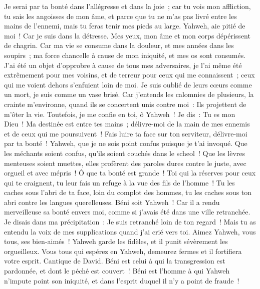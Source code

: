 \begin{multicols}{2}
Je serai par ta bonté dans l'allégresse et dans la joie~; car tu vois mon affliction, tu sais les angoisses de mon âme,
et parce que tu ne m'as pas livré entre les mains de l'ennemi, mais tu feras tenir mes pieds au large.
Yahweh, aie pitié de moi~! Car je suis dans la détresse. Mes yeux, mon âme et mon corps dépérissent de chagrin.
Car ma vie se consume dans la douleur, et mes années dans les soupirs~; ma force chancelle à cause de mon iniquité, et mes os sont consumés.
J'ai été un objet d'opprobre à cause de tous mes adversaires, je l'ai même été extrêmement pour mes voisins, et de terreur pour ceux qui me connaissent~; ceux qui me voient dehors s'enfuient loin de moi.
Je suis oublié de leurs cœurs comme un mort, je suis comme un vase brisé.
Car j'entends les calomnies de plusieurs, la crainte m'environne, quand ils se concertent unis contre moi~: Ils projettent de m'ôter la vie.
Toutefois, je me confie en toi, ô Yahweh~! Je dis~: Tu es mon Dieu~!
Ma destinée est entre tes mains~; délivre-moi de la main de mes ennemis et de ceux qui me poursuivent~!
Fais luire ta face sur ton serviteur, délivre-moi par ta bonté~!
Yahweh, que je ne sois point confus puisque je t'ai invoqué. Que les méchants soient confus, qu'ils soient couchés dans le scheol~!
Que les lèvres menteuses soient muettes, elles profèrent des paroles dures contre le juste, avec orgueil et avec mépris~!
Ô que ta bonté est grande~! Toi qui la réserves pour ceux qui te craignent, tu leur fais un refuge à la vue des fils de l'homme~!
Tu les caches sous l'abri de ta face, loin du complot des hommes, tu les caches sous ton abri contre les langues querelleuses.
Béni soit Yahweh~! Car il a rendu merveilleuse sa bonté envers moi, comme si j'avais été dans une ville retranchée.
Je disais dans ma précipitation~: Je suis retranché loin de ton regard~! Mais tu as entendu la voix de mes supplications quand j'ai crié vers toi.
Aimez Yahweh, vous tous, ses bien-aimés~! Yahweh garde les fidèles, et il punit sévèrement les orgueilleux.
 Vous tous qui espérez en Yahweh, demeurez fermes et il fortifiera votre esprit. 
\VerseOne{}Cantique de David. Béni est celui à qui la transgression est pardonnée, et dont le péché est couvert~!
Béni est l'homme à qui Yahweh n'impute point son iniquité, et dans l'esprit duquel il n'y a point de fraude~!

\end{multicols}
